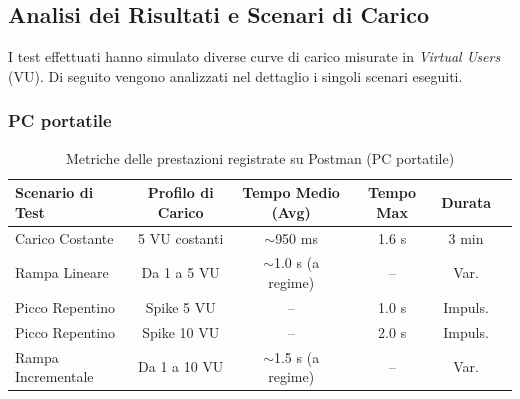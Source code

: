 \subsection{Analisi dei Risultati e Scenari di Carico}
I test effettuati hanno simulato diverse curve di carico misurate in \textit{Virtual Users} (VU). Di seguito vengono analizzati nel dettaglio i singoli scenari eseguiti.

\subsubsection{PC portatile}
\begin{table}[H] %
\centering
\small
\caption{Metriche delle prestazioni registrate su Postman (PC portatile)}
\label{tab:test_postman_portatile}
\begin{tabular}{lccccc}
\toprule
\textbf{Scenario di Test} & \textbf{Profilo di Carico} & \textbf{Tempo Medio (Avg)} & \textbf{Tempo Max} & \textbf{Durata} \\
\midrule
Carico Costante & 5 VU costanti & $\sim$950 ms & 1.6 s & 3 min  \\
Rampa Lineare & Da 1 a 5 VU & $\sim$1.0 s (a regime) & -- & Var.\\
Picco Repentino & Spike 5 VU & -- & 1.0 s & Impuls. \\
Picco Repentino & Spike 10 VU & -- & 2.0 s & Impuls. \\
Rampa Incrementale & Da 1 a 10 VU & $\sim$1.5 s (a regime) & -- & Var. \\
\bottomrule
\end{tabular}
\end{table}

